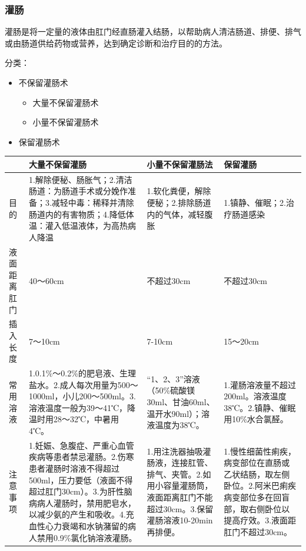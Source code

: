 \documentclass[11pt, a4paper]{ctexart}
\begin{document}
\subsubsection{灌肠}
灌肠是将一定量的液体由肛门经直肠灌入结肠，以帮助病人清洁肠道、排便、排气或由肠道供给药物或营养，达到确定诊断和治疗目的的方法。

分类：
\begin{itemize}
    \item 不保留灌肠术
    \begin{itemize}
        \item 大量不保留灌肠术
        \item 小量不保留灌肠术
    \end{itemize}
    \item 保留灌肠术
\end{itemize}

\begin{table}[htbp]
\centering
\begin{tabular}{|p{3cm}|p{4cm}|p{4cm}|p{4cm}|}
\hline
 & \textbf{大量不保留灌肠} & \textbf{小量不保留灌肠法} & \textbf{保留灌肠} \\
\hline
目的 & 1.解除便秘、肠胀气；2.清洁肠道：为肠道手术或分娩作准备；3.减轻中毒：稀释并清除肠道内的有害物质；4.降低体温：灌入低温液体，为高热病人降温 & 1.软化粪便，解除便秘；2.排除肠道内的气体，减轻腹胀 & 1.镇静、催眠；2.治疗肠道感染 \\
\hline
液面距离肛门 & 40～60cm & 不超过30cm & 不超过30cm \\
\hline
插入长度 & 7～10cm & 7-10cm & 15～20cm \\
\hline
常用溶液 & 1.0.1\%～0.2\%的肥皂液、生理盐水。2.成人每次用量为500～1000ml，小儿200～500ml。3.溶液温度一般为39～41℃，降温时用28～32℃，中暑用4℃。 & “1、2、3”溶液（50\%硫酸镁30ml、甘油60ml、温开水90ml）；溶液温度为38℃。 & 1.灌肠溶液量不超过200ml。溶液温度38℃。2.镇静、催眠用10\%水合氯醛。 \\
\hline
注意事项 & 1.妊娠、急腹症、严重心血管疾病等患者禁忌灌肠。2.伤寒患者灌肠时溶液不得超过500ml，压力要低（液面不得超过肛门30cm）。3.为肝性脑病病人灌肠时，禁用肥皂水，以减少氨的产生和吸收。4.充血性心力衰竭和水钠潴留的病人禁用0.9\%氯化钠溶液灌肠。 & 1.用注洗器抽吸灌肠液，连接肛管、排气、夹管。2.如用小容量灌肠筒，液面距离肛门不能超过30cm。3.保留灌肠溶液10-20min再排便。 & 1.慢性细菌性痢疾，病变部位在直肠或乙状结肠，取左侧卧位。2.阿米巴痢疾病变部位多在回盲部，取右侧卧位以提高疗效。3.液面距肛门不超过30cm。 \\
\hline
\end{tabular}
\end{table}
\end{document}
